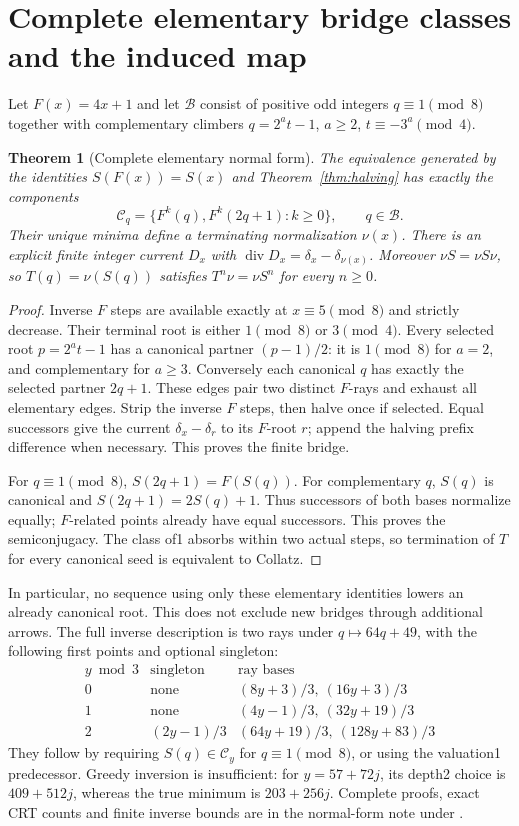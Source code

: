 \documentclass[11pt]{article}
\newtheorem{theorem}{Theorem}
\begin{document}
\section{Complete elementary bridge classes and the induced map}
Let $F(x)=4x+1$ and let $\mathcal B$ consist of positive odd integers
$q\equiv1\pmod8$ together with complementary climbers
$q=2^at-1$, $a\ge2$, $t\equiv-3^a\pmod4$.
\begin{theorem}[Complete elementary normal form]\label{thm:bridgenormal}
The equivalence generated by the identities $S(F(x))=S(x)$ and
Theorem~\ref{thm:halving} has exactly the components
\[
\mathcal C_q=\{F^k(q),F^k(2q+1):k\ge0\},\qquad q\in\mathcal B.
\]
Their unique minima define a terminating normalization $\nu(x)$.
There is an explicit finite integer current $D_x$ with
$\operatorname{div}D_x=\delta_x-\delta_{\nu(x)}$.
Moreover $\nu S=\nu S\nu$, so $T(q)=\nu(S(q))$ satisfies
$T^n\nu=\nu S^n$ for every $n\ge0$.
\end{theorem}
\begin{proof}
Inverse $F$ steps are available exactly at $x\equiv5\pmod8$ and
strictly decrease. Their terminal root is either $1\pmod8$ or $3\pmod4$.
Every selected root $p=2^at-1$ has a canonical partner $(p-1)/2$:
it is $1\pmod8$ for $a=2$, and complementary for $a\ge3$.
Conversely each canonical $q$ has exactly the selected partner $2q+1$.
These edges pair two distinct $F$-rays and exhaust all elementary edges.
Strip the inverse $F$ steps, then halve once if selected. Equal successors
give the current $\delta_x-\delta_r$ to its $F$-root $r$; append the
halving prefix difference when necessary. This proves the finite bridge.

For $q\equiv1\pmod8$,
$S(2q+1)=F(S(q))$. For complementary $q$, $S(q)$ is canonical and
$S(2q+1)=2S(q)+1$. Thus successors of both bases normalize equally;
$F$-related points already have equal successors. This proves the
semiconjugacy. The class of1 absorbs within two actual steps, so
termination of $T$ for every canonical seed is equivalent to Collatz.
\end{proof}
In particular, no sequence using only these elementary identities lowers
an already canonical root. This does not exclude new bridges through
additional arrows. The full inverse description is two rays under
$q\mapsto64q+49$, with the following first points and optional singleton:
\[
\begin{array}{c|c|c}
y\bmod3&\text{singleton}&\text{ray bases}\\\hline
0&\text{none}&(8y+3)/3,\ (16y+3)/3\\
1&\text{none}&(4y-1)/3,\ (32y+19)/3\\
2&(2y-1)/3&(64y+19)/3,\ (128y+83)/3
\end{array}
\]
They follow by requiring $S(q)\in\mathcal C_y$ for $q\equiv1\pmod8$,
or using the valuation1 predecessor. Greedy inversion is insufficient:
for $y=57+72j$, its depth2 choice is $409+512j$, whereas the true minimum
is $203+256j$. Complete proofs, exact CRT counts and finite inverse bounds
are in the normal-form note under
.
\end{document}
